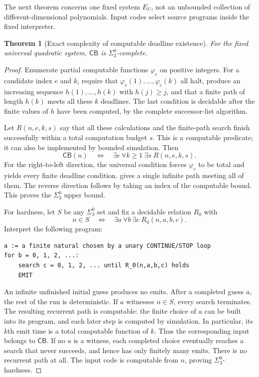 \documentclass[11pt,letterpaper]{article}
\newtheorem{theorem}{Theorem}[section]
\theoremstyle{definition}
\theoremstyle{remark}
\newcommand{\CB}{\mathsf{CB}}
\newcommand{\1}{\mathbf 1}
\begin{document}
The next theorem concerns one fixed system $E_U$, not an unbounded collection
of different-dimensional polynomials. Input codes select source programs
inside the fixed interpreter.

\begin{theorem}[Exact complexity of computable deadline existence]
\label{lbh:qd:thm:cb}
For the fixed universal quadratic system, $\CB$ is $\Sigma^0_3$-complete.
\end{theorem}

\begin{proof}
Enumerate partial computable functions $\varphi_e$ on positive integers.
For a candidate index $e$ and $k$, require that $\varphi_e(1),\ldots,
\varphi_e(k)$ all halt, produce an increasing sequence $h(1),\ldots,h(k)$
with $h(j)\geq j$, and that a finite path of length $h(k)$ meets all these
$k$ deadlines. The last condition is decidable after the finite values of
$h$ have been computed, by the complete successor-list algorithm.

Let $R(n,e,k,s)$ say that all these calculations and the finite-path search
finish successfully within a total computation budget $s$. This is a
computable predicate; it can also be implemented by bounded simulation.
Then
\begin{equation}\label{lbh:qd:eq:cbnormal}
 \CB(n)\quad\Longleftrightarrow\quad
 \exists e\ \forall k\geq1\ \exists s\;R(n,e,k,s).
\end{equation}
For the right-to-left direction, the universal condition forces
$\varphi_e$ to be total and yields every finite deadline condition.
 gives a single infinite path meeting all of them.
The reverse direction follows by taking an index of the computable bound.
This proves the $\Sigma^0_3$ upper bound.

For hardness, let $S$ be any $\Sigma^0_3$ set and fix a decidable relation
$R_0$ with
\[
 n\in S\quad\Longleftrightarrow\quad
 \exists a\ \forall b\ \exists c\;R_0(n,a,b,c).
\]
Interpret the following program:
\begin{lstlisting}
a := a finite natural chosen by a unary CONTINUE/STOP loop
for b = 0, 1, 2, ...:
    search c = 0, 1, 2, ... until R_0(n,a,b,c) holds
    EMIT
\end{lstlisting}
An infinite unfinished initial guess produces no emits. After a completed
guess $a$, the rest of the run is deterministic. If $a$ witnesses $n\in S$,
every search terminates. The resulting recurrent path is computable: the
finite choice of $a$ can be built into its program, and each later step is
computed by simulation. In particular, its $k$th emit time is a total
computable function of $k$. Thus the corresponding input belongs to $\CB$.
If no $a$ is a witness, each completed choice eventually reaches a search
that never succeeds, and hence has only finitely many emits. There is no
recurrent path at all. The input code is computable from $n$, proving
$\Sigma^0_3$-hardness.
\end{proof}
\end{document}
